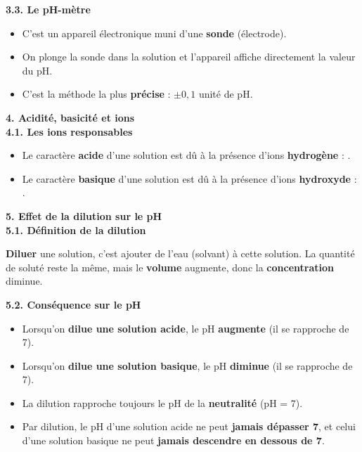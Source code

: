 \documentclass[11pt,a4paper]{article}
\begin{document}
\textbf{3.3. Le pH-mètre}

\begin{itemize}
    \item C'est un appareil électronique muni d'une \textbf{sonde} (électrode).
    \item On plonge la sonde dans la solution et l'appareil affiche directement la valeur du pH.
    \item C'est la méthode la plus \textbf{précise} : $\pm 0{,}1$ unité de pH.
\end{itemize}

\textbf{4. Acidité, basicité et ions} \\

\textbf{4.1. Les ions responsables}

\begin{tcolorbox}[colback=red!5!white,colframe=red!75!black]
{
\begin{itemize}
    \item Le caractère \textbf{acide} d'une solution est dû à la présence d'ions \textbf{hydrogène} : .
    \item Le caractère \textbf{basique} d'une solution est dû à la présence d'ions \textbf{hydroxyde} : .
\end{itemize}
}
\end{tcolorbox}


\textbf{5. Effet de la dilution sur le pH} \\

\textbf{5.1. Définition de la dilution}

\begin{tcolorbox}[colback=red!5!white,colframe=red!75!black]
{
\textbf{Diluer} une solution, c'est ajouter de l'eau (solvant) à cette solution. La quantité de soluté reste la même, mais le \textbf{volume} augmente, donc la \textbf{concentration} diminue.
}
\end{tcolorbox}


\textbf{5.2. Conséquence sur le pH}

\begin{tcolorbox}[colback=red!5!white,colframe=red!75!black]
{
\begin{itemize}
    \item Lorsqu'on \textbf{dilue une solution acide}, le pH \textbf{augmente} (il se rapproche de 7).
    \item Lorsqu'on \textbf{dilue une solution basique}, le pH \textbf{diminue} (il se rapproche de 7).
    \item La dilution rapproche toujours le pH de la \textbf{neutralité} (pH = 7).
    \item Par dilution, le pH d'une solution acide ne peut \textbf{jamais dépasser 7}, et celui d'une solution basique ne peut \textbf{jamais descendre en dessous de 7}.
\end{itemize}
}
\end{tcolorbox}
\end{document}
